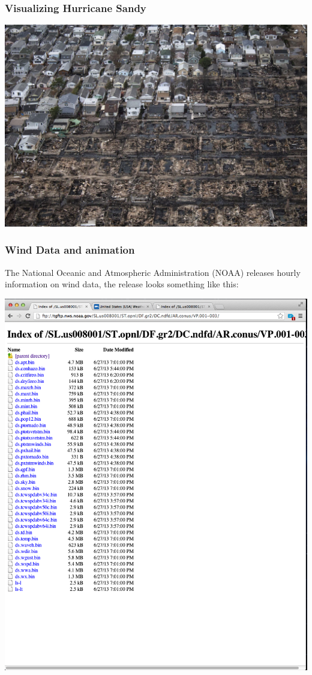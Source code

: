 \documentclass{beamer} %
\newcommand{\1}{\mathbb{1}}
\begin{document}
{		\begin{frame}[t]\frametitle{Visualizing Hurricane Sandy}
		\includegraphics[scale = 0.7]{./visualization/sandy3.jpg}
		\end{frame}


		\begin{frame}[t]\frametitle{Wind Data and animation}
			The National Oceanic and Atmospheric Administration (NOAA) releases hourly information on wind data, the release looks something like this:\\
			\begin{center}
			\includegraphics[scale = 0.15]{./visualization/windData_db.png}\\
			\end{center}
		\end{frame}

}
\end{document}
